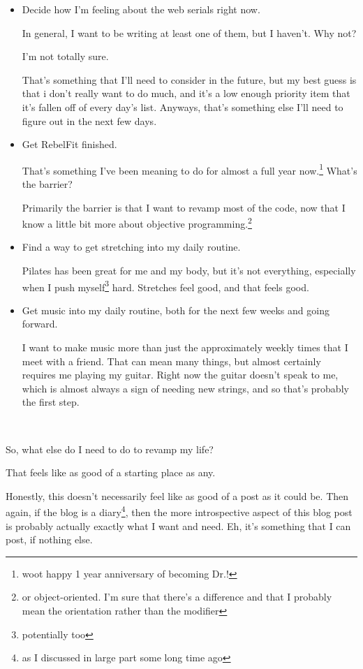 \documentclass[12pt]{article}
\renewcommand{\,}{\textsuperscript{,}}
\begin{document}
\begin{itemize}
\begin{itemize}
\end{itemize}

\item Decide how I'm feeling about the web serials right now.

In general, I want to be writing at least one of them, but I haven't.  
Why not?

I'm not totally sure.

That's something that I'll need to consider in the future, but my best guess is that i don't really want to do much, and it's a low enough priority item that it's fallen off of every day's list.  
Anyways, that's something else I'll need to figure out in the next few days.

\item Get RebelFit finished.

That's something I've been meaning to do for almost a full year now.\footnote{woot happy 1 year anniversary of becoming Dr.!}  
What's the barrier?

Primarily the barrier is that I want to revamp most of the code, now that I know a little bit more about objective programming.\footnote{or object-oriented. I'm sure that there's a difference and that I probably mean the orientation rather than the modifier}

\item Find a way to get stretching into my daily routine.

Pilates has been great for me and my body, but it's not everything, especially when I push myself\footnote{potentially too} hard.  
Stretches feel good, and that feels good.

\item Get music into my daily routine, both for the next few weeks and going forward.

I want to make music more than just the approximately weekly times that I meet with a friend.  
That can mean many things, but almost certainly requires me playing my guitar.  
Right now the guitar doesn't speak to me, which is almost always a sign of needing new strings, and so that's probably the first step.

 \end{itemize}

So, what else do I need to do to revamp my life?

That feels like as good of a starting place as any.

Honestly, this doesn't necessarily feel like as good of a post as it could be.  
Then again, if the blog is a diary\footnote{as I discussed in large part some long time ago}, then the more introspective aspect of this blog post is probably actually exactly what I want and need.  
Eh, it's something that I can post, if nothing else.
\end{document}
